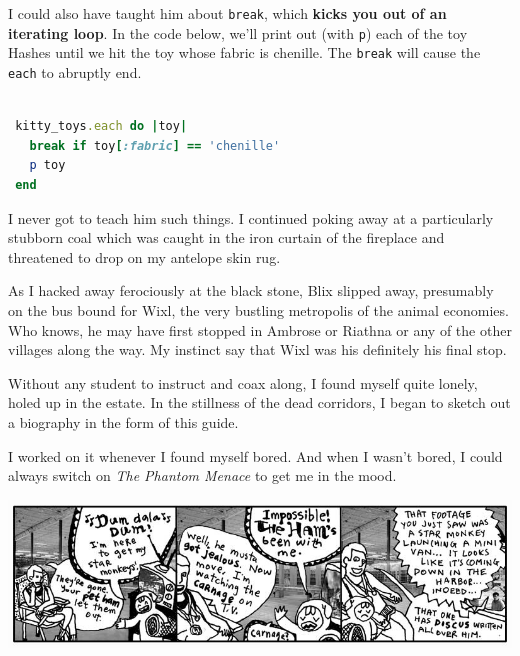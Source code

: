 \documentclass[10pt,twoside]{report}
\begin{document}
I could also have taught him about \lstinline[breaklines=true]|break|,
which {\bf kicks you out of an iterating loop}. In the code below,
we'll print out (with \lstinline[breaklines=true]|p|) each of the toy
Hashes until we hit the toy whose fabric is chenille.  The
\lstinline[breaklines=true]|break| will cause the
\lstinline[breaklines=true]|each| to abruptly end.


\begin{lstlisting}[basicstyle=\ttfamily\color{basiccolor},
    commentstyle = \ttfamily\color{commentcolor},
    keywordstyle=\ttfamily\color{keywordscolor},
    stringstyle=\color{stringcolor},
    language=Ruby,
    basicstyle=\small\ttfamily,
    showstringspaces=false,
  ]

 kitty_toys.each do |toy|
   break if toy[:fabric] == 'chenille'
   p toy
 end

\end{lstlisting}

I never got to teach him such things.  I continued poking away at a
particularly stubborn coal which was caught in the iron curtain of the
fireplace and threatened to drop on my antelope skin rug.

As I hacked away ferociously at the black stone, Blix slipped away,
presumably on the bus bound for Wixl, the very bustling metropolis of
the animal economies.  Who knows, he may have first stopped in Ambrose
or Riathna or any of the other villages along the way.  My instinct
say that Wixl was his definitely his final stop.

Without any student to instruct and coax along, I found myself quite
lonely, holed up in the estate.  In the stillness of the dead
corridors, I began to sketch out a biography in the form of this
guide.

I worked on it whenever I found myself bored.  And when I wasn't
bored, I could always switch on {\em The Phantom Menace} to get me in
the mood.

	\includegraphics[width=1.0\textwidth]{cache/31.png}
\newpage
\thispagestyle{empty}
\mbox{}
\cleartooddpage
\end{document}
